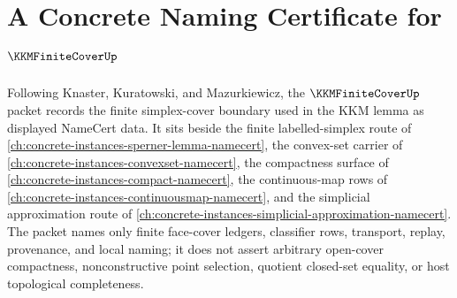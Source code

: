 \chapter{A Concrete Naming Certificate for $\KKMFiniteCoverUp$}
\label{ch:concrete-instances-kkm-finite-cover-namecert}

Following Knaster, Kuratowski, and Mazurkiewicz, the $\KKMFiniteCoverUp$ packet records the finite simplex-cover boundary used in the KKM lemma as displayed NameCert data. It sits beside the finite labelled-simplex route of \autoref{ch:concrete-instances-sperner-lemma-namecert}, the convex-set carrier of \autoref{ch:concrete-instances-convexset-namecert}, the compactness surface of \autoref{ch:concrete-instances-compact-namecert}, the continuous-map rows of \autoref{ch:concrete-instances-continuousmap-namecert}, and the simplicial approximation route of \autoref{ch:concrete-instances-simplicial-approximation-namecert}. The packet names only finite face-cover ledgers, classifier rows, transport, replay, provenance, and local naming; it does not assert arbitrary open-cover compactness, nonconstructive point selection, quotient closed-set equality, or host topological completeness.


